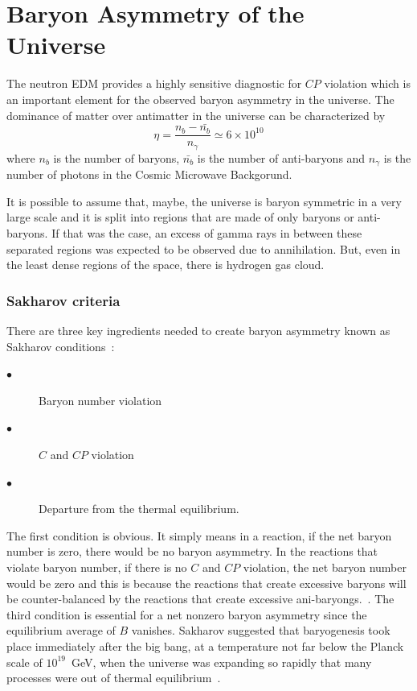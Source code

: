\section{Baryon Asymmetry of the Universe}
The neutron EDM provides a highly sensitive diagnostic for $CP$
violation which is an important element for the observed
baryon asymmetry in the universe.  The dominance of matter over
antimatter in the universe can be characterized by~\cite{Cline}
\begin{equation}
\eta = \frac{n_b-\bar{n_b}}{n_{\gamma}} \simeq 6 \times 10^{10}
\end{equation}
where $n_b$ is the number of baryons, $\bar{n_b}$ is the number of
anti-baryons and $n_{\gamma}$ is the number of photons in the Cosmic
Microwave Backgorund.

It is possible to assume that, maybe, the universe is baryon symmetric
in a very large scale and it is split into regions that are made of
only baryons or anti-baryons. If that was the case, an excess of gamma
rays in between these separated regions was expected to be observed
due to annihilation. But, even in the least dense regions of the
space, there is hydrogen gas cloud.

\subsubsection{Sakharov criteria}
There are three key ingredients needed to
create baryon asymmetry known as Sakharov conditions~\cite{Sakharov:1967dj}:
\begin{center}
\begin{description}
\item[$\bullet$]Baryon number violation
\item[$\bullet$] $C$ and $CP$ violation
\item[$\bullet$] Departure from the thermal equilibrium.
\end{description}
\end{center}

The first condition is obvious. It simply means in a reaction, if the
net baryon number is zero, there would be no baryon asymmetry. In the
reactions that violate baryon number, if there is no $C$ and $CP$
violation, the net baryon number would be zero and this is because the
reactions that create excessive baryons will be counter-balanced by
the reactions that create excessive
ani-baryongs.~\cite{theearlyuniverse}.  The third condition is
essential for a net nonzero baryon asymmetry since the equilibrium
average of $B$ vanishes. Sakharov suggested that baryogenesis took
place immediately after the big bang, at a temperature not far below
the Planck scale of $10^{19}$~GeV, when the universe was expanding so
rapidly that many processes were out of thermal
equilibrium~\cite{cohen1993progress}.




